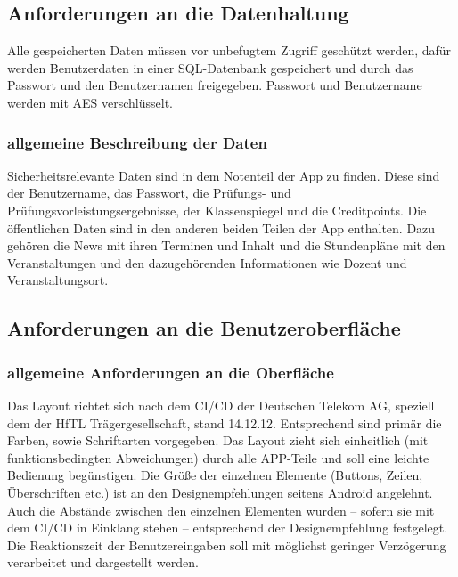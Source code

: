 \subsection{\textbf{Anforderungen an die Datenhaltung}}

Alle gespeicherten Daten müssen vor unbefugtem Zugriff geschützt werden, dafür werden Benutzerdaten in einer \acs{SQL}-Datenbank gespeichert und durch das Passwort und den Benutzernamen freigegeben. Passwort und Benutzername werden mit \acs{AES} verschlüsselt.

\subsubsection{allgemeine Beschreibung der Daten}
Sicherheitsrelevante Daten sind in dem Notenteil der App zu finden. Diese sind der Benutzername, das Passwort, die Prüfungs- und Prüfungsvorleistungsergebnisse, der Klassenspiegel und die Creditpoints.
Die öffentlichen Daten sind in den anderen beiden Teilen der App enthalten.
Dazu gehören die News mit ihren Terminen und Inhalt und die Stundenpläne mit den Veranstaltungen und den dazugehörenden Informationen wie Dozent und Veranstaltungsort.


\subsection{\textbf{Anforderungen an die Benutzeroberfläche}}

\subsubsection{allgemeine Anforderungen an die Oberfläche}

Das Layout richtet sich nach dem  \ac{CI/CD} der Deutschen Telekom AG, speziell dem der \acs{HfTL} Trägergesellschaft, stand 14.12.12. Entsprechend sind primär die Farben, sowie Schriftarten vorgegeben. Das Layout zieht sich einheitlich (mit funktionsbedingten Abweichungen) durch alle APP-Teile und soll eine leichte Bedienung begünstigen.
Die Größe der einzelnen Elemente (Buttons, Zeilen, Überschriften etc.) ist an den Designempfehlungen seitens Android angelehnt. 
Auch die Abstände zwischen den einzelnen Elementen wurden – sofern sie mit dem \ac{CI/CD} in Einklang stehen – entsprechend der Designempfehlung festgelegt.
Die Reaktionszeit der Benutzereingaben soll mit möglichst geringer Verzögerung verarbeitet und dargestellt werden.







